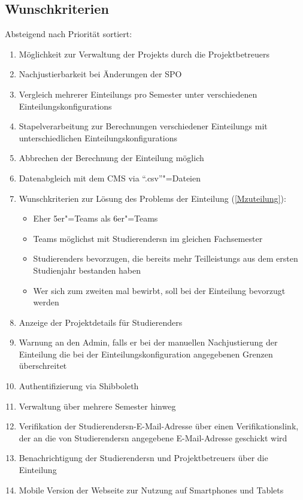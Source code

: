 \documentclass[parskip=full]{scrartcl}
\newcommand{\swtLabel}[1]{\textbf{/#1\arabic*0/}}
\begin{document}
\subsection{Wunschkriterien}
Absteigend nach Priorität sortiert:
\begin{enumerate}[label=\swtLabel{W}]
  \item Möglichkeit zur Verwaltung der \glspl{Projekt} durch die \glspl{Projektbetreuer}
      \item Nachjustierbarkeit bei Änderungen der \gls{SPO} 
  
    \item Vergleich mehrerer \glspl{Einteilung} pro Semester unter verschiedenen \glspl{Einteilungskonfiguration}
  \item Stapelverarbeitung zur Berechnungen verschiedener \glspl{Einteilung} mit
    unterschiedlichen \glspl{Einteilungskonfiguration}
  \item Abbrechen der Berechnung der \gls{Einteilung} möglich 
        \item Datenabgleich mit dem \gls{CMS} via \enquote{.csv}"=Dateien 

    \item Wunschkriterien zur Lösung des Problems der \gls{Einteilung} (\ref{Mzuteilung}):
    \begin{itemize}
        \item Eher 5er"=\glspl{Team} als 6er"=\glspl{Team}
        \item \glspl{Team} möglichst mit \glspl{Studierender}n im gleichen
        Fachsemester
        \item \glspl{Studierender} bevorzugen, die bereits mehr \glspl{Teilleistung} aus dem
        ersten Studienjahr bestanden haben
        \item Wer sich zum zweiten mal bewirbt, soll bei der \gls{Einteilung} bevorzugt werden
    \end{itemize}    
\item Anzeige der \gls{Projektdetails} für \glspl{Studierender} %
\item Warnung an den \gls{Admin}, falls er bei der manuellen Nachjustierung 
    der \gls{Einteilung} die bei der \gls{Einteilungskonfiguration} angegebenen Grenzen überschreitet
    \item Authentifizierung via \gls{Shibboleth}
    \item Verwaltung über mehrere Semester hinweg
    \item Verifikation der \glspl{Studierender}n-E-Mail-Adresse über einen
    Verifikationslink, der an die von \glspl{Studierender}n angegebene E-Mail-Adresse
    geschickt wird
    \item Benachrichtigung der \glspl{Studierender}n und \glspl{Projektbetreuer}
    über die \gls{Einteilung}
    
    
    \item Mobile Version der Webseite zur Nutzung auf Smartphones und Tablets
    
\end{enumerate}
\end{document}
